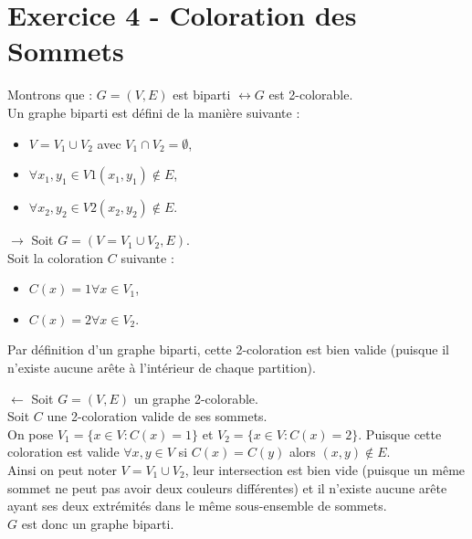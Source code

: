 
\section{Exercice 4 - Coloration des Sommets}\label{ex4}
Montrons que : $G = (V,E)$ est biparti $\leftrightarrow G$ est 2-colorable.\\
Un graphe biparti est d\'efini de la mani\`ere suivante :
\begin{itemize}
	\item $V = V_1 \cup V_2$ avec $V_1 \cap V_2 = \emptyset$,
	\item $\forall x_1,y_1 \in V1 (x_1,y_1) \notin E$,
	\item $\forall x_2,y_2 \in V2 (x_2,y_2) \notin E$.
\end{itemize}

$\rightarrow$ Soit $G = (V = V_1 \cup V_2,E)$.\\
Soit la coloration $C$ suivante :
\begin{itemize}
	\item $C(x) = 1 \forall x \in V_1$,
	\item $C(x) = 2 \forall x \in V_2$.
\end{itemize}
Par d\'efinition d'un graphe biparti, cette 2-coloration est bien valide (puisque il
n'existe aucune ar\^ete \`a l'int\'erieur de chaque partition).

$\leftarrow$ Soit $G = (V,E)$ un graphe 2-colorable.\\
Soit $C$ une 2-coloration valide de ses sommets.\\
On pose $V_1 = \{x \in V : C(x) = 1\}$ et $V_2 = \{x \in V : C(x) = 2\}$.
Puisque cette coloration est valide $\forall x,y \in V$ si $C(x) = C(y)$ alors
$(x,y) \notin E$.\\
Ainsi on peut noter $V = V_1 \cup V_2$, leur intersection est bien vide (puisque un
m\^eme sommet ne peut pas avoir deux couleurs diff\'erentes) et il n'existe aucune
ar\^ete ayant ses deux extr\'emit\'es dans le m\^eme sous-ensemble de sommets.\\
$G$ est donc un graphe biparti.

